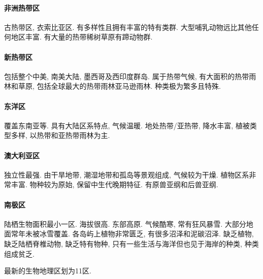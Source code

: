 \documentclass{ctexart}
\begin{document}
\paragraph{非洲热带区} %
\label{par:非洲热带区}

古热带区, 衣索比亚区. 有多样性且拥有丰富的特有类群. 大型哺乳动物远比其他任何地区丰富. 有大量的热带稀树草原有蹄动物群.


\paragraph{新热带区} %
\label{par:新热带区}

包括整个中美, 南美大陆, 墨西哥及西印度群岛. 属于热带气候, 有大面积的热带雨林和草原, 包括全球最大的热带雨林亚马逊雨林. 种类极为繁多且特殊.


\paragraph{东洋区} %
\label{par:东洋区}

覆盖东南亚等. 具有大陆区系特点, 气候温暖. 地处热带/亚热带, 降水丰富, 植被类型多样, 以热带和亚热带雨林为主.


\paragraph{澳大利亚区} %
\label{par:澳大利亚区}

独立性最强. 由干旱地带, 潮湿地带和孤岛等景观组成, 气候较为干燥. 植物区系非常丰富. 物种较为原始, 保留中生代晚期特征. 有原兽亚纲和后兽亚纲.


\paragraph{南极区} %
\label{par:南极区}

陆栖生物面积最小一区. 海拔很高. 东部高原. 气候酷寒, 常有狂风暴雪. 大部分地面常年未被冰雪覆盖. 各岛屿上植物非常匮乏, 有很多沼泽和泥碳沼泽. 缺乏植物, 缺乏陆栖脊椎动物, 缺乏特有物种, 只有一些生活与海洋但也见于海岸的种类, 种类组成贫乏.


\begin{remark}
    最新的生物地理区划为11区.
\end{remark}
\end{document}

